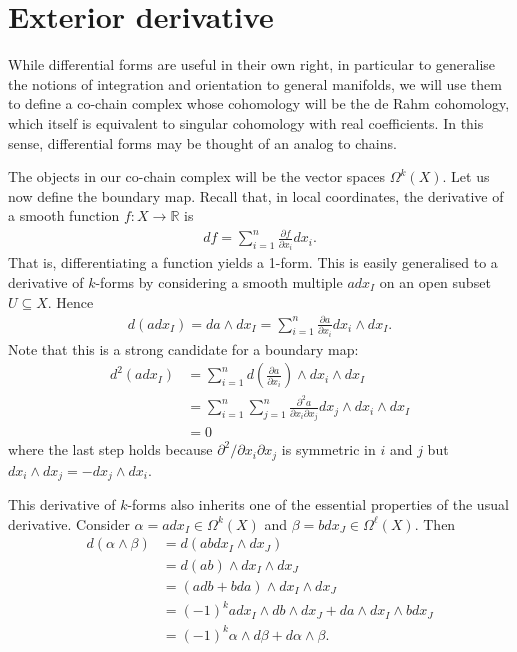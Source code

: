 \documentclass{article}
\begin{document}
\begin{definition}
\end{definition}

\section{Exterior derivative}

While differential forms are useful in their own right, in particular
to generalise the notions of integration and orientation to general
manifolds, we will use them to define a co-chain complex whose cohomology will be the de Rahm cohomology, which itself is equivalent to singular
cohomology with real coefficients. In this sense, differential forms
may be thought of an analog to chains.

The objects in our co-chain complex will be the vector spaces $\Omega^k(X)$. Let us now define the boundary map. Recall that, in local coordinates,
the derivative of a smooth function $f:X\to\mathbb{R}$ is
\begin{align*}
  df = \sum_{i=1}^n \frac{\partial f}{\partial x_i} dx_i.
\end{align*}
That is, differentiating a function yields a 1-form. This is easily
generalised to a derivative of $k$-forms by considering a smooth
multiple $a dx_I$ on an open subset $U\subseteq X$. Hence
\begin{align}\label{eq:local_exterior_derivative}
  d(adx_I) = da\wedge dx_I = \sum_{i=1}^n \frac{\partial a}{\partial x_i} dx_i\wedge dx_I.
\end{align}
Note that this is a strong candidate for a boundary map:
\begin{align*}
  d^2(adx_I) &= \sum_{i=1}^{n} d\left({\frac{\partial a}{\partial x_i}}\right)\wedge dx_i \wedge dx_I\\
             &= \sum_{i=1}^{n} \sum_{j=1}^{n} \frac{\partial^2 a}{\partial x_i \partial x_j} dx_j\wedge dx_i \wedge dx_I \\
             &= 0
\end{align*}
where the last step holds because $\partial^2/\partial x_i\partial x_j$ is symmetric in $i$ and $j$ but $dx_i\wedge dx_j = -dx_j \wedge dx_i$.

This derivative of $k$-forms also inherits one of the essential properties of the usual derivative. Consider $\alpha=adx_I\in\Omega^k(X)$ and $\beta=bdx_J\in\Omega^\ell(X)$. Then
\begin{align*}
  d(\alpha\wedge\beta) &= d(abdx_I\wedge dx_J) \\
                       &= d(ab)\wedge dx_I\wedge dx_J \\
                       &= (adb + bda)\wedge dx_I\wedge dx_J \\
                       &=(-1)^k a dx_I\wedge db \wedge dx_J
                       + da \wedge dx_I\wedge bdx_J \\
                       &= (-1)^k \alpha\wedge d\beta + d\alpha\wedge\beta.
\end{align*}
\end{document}
